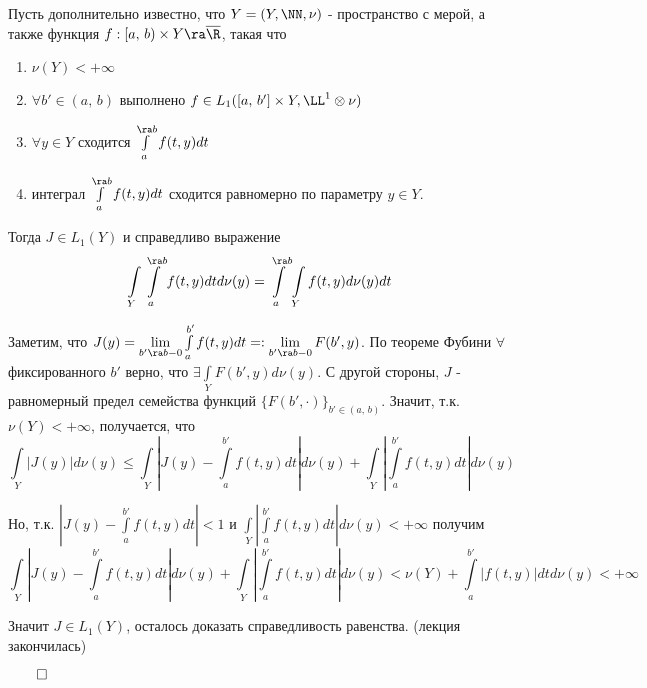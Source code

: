 \theorem Пусть дополнительно известно, что $Y = (Y, \NN, \nu)$ - пространство с мерой, а также функция $f: [a, \, b) \times Y \ra \overline{\R}$, такая что 
\begin{enumerate}
    \item $\nu(Y) < + \infty$
    \item $\forall b' \in (a, \, b)$ выполнено $f \in L_1([a, \, b'] \times Y, \LL^1 \otimes \nu)$
    \item $\forall y \in Y$ сходится $\int\limits^{\ra b}_a f(t, y) dt$
    \item интеграл $\int\limits^{\ra b}_{a} f(t, y) dt$ сходится равномерно по параметру $y \in Y$.
\end{enumerate}


Тогда $J \in L_1(Y)$ и справедливо выражение
$$\int\limits_Y\int\limits^{\ra b}_a f(t, y)dtd\nu(y) = \int\limits_a^{\ra b} \int\limits_Y f(t, y) d\nu(y) dt$$

\proof Заметим, что $J(y) = \lim\limits_{b' \ra b - 0}\int\limits_a^{b'} f(t, y) dt =: \lim\limits_{b' \ra b - 0} F(b', y)$. По теореме Фубини $\forall$ фиксированного $b'$ верно, что $\exists \int\limits_Y F(b', y) d\nu(y)$. С другой стороны, $J$ - равномерный предел семейства функций $\{ F(b', \cdot) \}_{b' \in (a, \, b)}$. Значит, т.к. $\nu(Y) < +\infty$, получается, что
$$\int\limits_Y \left| J(y) \right| d\nu(y) \leq \int\limits_Y\left| J(y) - \int\limits_a^{b'} f(t, y) dt \right| d\nu(y) + \int\limits_Y \left| \int\limits_a^{b'} f(t, y) dt \right| d\nu(y)$$

Но, т.к. $\left| J(y) - \int\limits_a^{b'} f(t, y) dt \right| < 1$ и $\int\limits_Y \left| \int\limits_a^{b'} f(t, y) dt \right| d\nu(y) < +\infty$ получим
$$\int\limits_Y\left| J(y) - \int\limits_a^{b'} f(t, y) dt \right| d\nu(y) + \int\limits_Y \left| \int\limits_a^{b'} f(t, y) dt \right| d\nu(y) < \nu(Y) + \int\limits_a^{b'} \left| f(t, y) \right| dt d\nu(y) < +\infty$$

Значит $J \in L_1(Y)$, осталось доказать справедливость равенства. (лекция закончилась)

$\qed$

